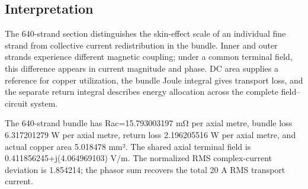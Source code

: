 \documentclass[journal,10pt]{IEEEtran}
\begin{document}
\subsection*{Interpretation}
\hypertarget{04.interpretation.heading}{}
The 640-strand section distinguishes the skin-effect scale of an individual fine strand from collective current redistribution in the bundle. Inner and outer strands experience different magnetic coupling; under a common terminal field, this difference appears in current magnitude and phase. DC area supplies a reference for copper utilization, the bundle Joule integral gives transport loss, and the separate return integral describes energy allocation across the complete field–circuit system.


The 640-strand bundle has Rac=15.793003197 mΩ per axial metre, bundle loss 6.317201279 W per axial metre, return loss 2.196205516 W per axial metre, and actual copper area 5.018478 mm². The shared axial terminal field is 0.411856245+j(4.064969103) V/m. The normalized RMS complex-current deviation is 1.854214; the phasor sum recovers the total 20 A RMS transport current.
\end{document}
